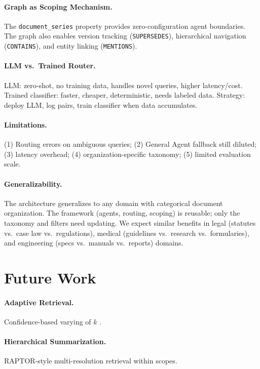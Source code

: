 \documentclass[11pt,a4paper]{article}
\begin{document}
\paragraph{Graph as Scoping Mechanism.} The \texttt{document\_series} property provides zero-configuration agent boundaries. The graph also enables version tracking (\texttt{SUPERSEDES}), hierarchical navigation (\texttt{CONTAINS}), and entity linking (\texttt{MENTIONS}).

\paragraph{LLM vs.\ Trained Router.} LLM: zero-shot, no training data, handles novel queries, higher latency/cost. Trained classifier: faster, cheaper, deterministic, needs labeled data. Strategy: deploy LLM, log pairs, train classifier when data accumulates.

\paragraph{Limitations.} (1) Routing errors on ambiguous queries; (2) General Agent fallback still diluted; (3) latency overhead; (4) organization-specific taxonomy; (5) limited evaluation scale.

\paragraph{Generalizability.} The architecture generalizes to any domain with categorical document organization. The framework (agents, routing, scoping) is reusable; only the taxonomy and filters need updating. We expect similar benefits in legal (statutes vs.\ case law vs.\ regulations), medical (guidelines vs.\ research vs.\ formularies), and engineering (specs vs.\ manuals vs.\ reports) domains.


\section{Future Work}
\label{sec:future_work}

\paragraph{Adaptive Retrieval.} Confidence-based varying of $k$ \cite{asai2023selfrag, yan2024crag}.
\paragraph{Hierarchical Summarization.} RAPTOR-style \cite{sarthi2024raptor} multi-resolution retrieval within scopes.
\end{document}
